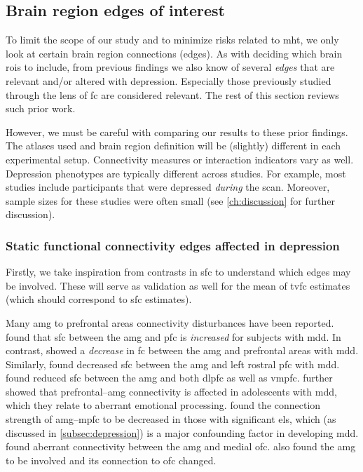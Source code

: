 \subsection{Brain region edges of interest}

To limit the scope of our study and to minimize risks related to \gls{mht}, we only look at certain brain region connections (edges).
As with deciding which brain \glspl{roi} to include, from previous findings we also know of several \emph{edges} that are relevant and/or altered with depression.
Especially those previously studied through the lens of \gls{fc} are considered relevant.
The rest of this section reviews such prior work.

However, we must be careful with comparing our results to these prior findings.
The atlases used and brain region definition will be (slightly) different in each experimental setup.
Connectivity measures or interaction indicators vary as well.
Depression phenotypes are typically different across studies.
For example, most studies include participants that were depressed \emph{during} the scan.
Moreover, sample sizes for these studies were often small (see \cref{ch:discussion} for further discussion).

\subsubsection{Static functional connectivity edges affected in depression}

Firstly, we take inspiration from contrasts in \gls{sfc} to understand which edges may be involved.
These will serve as validation as well for the mean of \gls{tvfc} estimates (which should correspond to \gls{sfc} estimates).

Many \gls{amg} to prefrontal areas connectivity disturbances have been reported.
\textcite{Zhang2020} found that \gls{sfc} between the \gls{amg} and \gls{pfc} is \emph{increased} for subjects with \gls{mdd}.
In contrast, \textcite{Dannlowski2009} showed a \emph{decrease} in \gls{fc} between the \gls{amg} and prefrontal areas with \gls{mdd}.
Similarly, \textcite{Kong2013} found decreased \gls{sfc} between the \gls{amg} and left rostral \gls{pfc} with \gls{mdd}.
\textcite{Connolly2017} found reduced \gls{sfc} between the \gls{amg} and both \gls{dlpfc} as well as \gls{vmpfc}.
\textcite{Willinger2022} further showed that prefrontal--\gls{amg} connectivity is affected in adolescents with \gls{mdd}, which they relate to aberrant emotional processing.
\textcite{Burghy2012} found the connection strength of \gls{amg}--\gls{mpfc} to be decreased in those with significant \gls{els}, which (as discussed in \cref{subsec:depression}) is a major confounding factor in developing \gls{mdd}.
\textcite{Rolls2020} found aberrant connectivity between the \gls{amg} and medial \gls{ofc}.
\textcite{Tang2018} also found the \gls{amg} to be involved and its connection to \gls{ofc} changed.

